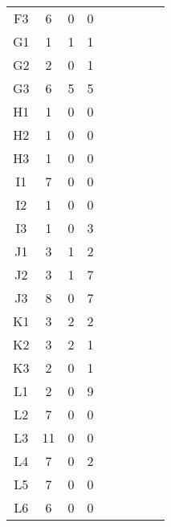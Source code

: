 \begin{center}
\begin{longtable}{ccccc|cccc}
    F3    & 6     & 0     & 0 \\
    G1    & 1     & 1     & 1 \\
    G2    & 2     & 0     & 1 \\
    G3    & 6     & 5     & 5 \\
    H1    & 1     & 0     & 0 \\
    H2    & 1     & 0     & 0 \\
    H3    & 1     & 0     & 0 \\
    I1    & 7     & 0     & 0 \\
    I2    & 1     & 0     & 0 \\
    I3    & 1     & 0     & 3 \\
    J1    & 3     & 1     & 2 \\
    J2    & 3     & 1     & 7 \\
    J3    & 8     & 0     & 7 \\
    K1    & 3     & 2     & 2 \\
    K2    & 3     & 2     & 1 \\
    K3    & 2     & 0     & 1 \\
    L1    & 2     & 0     & 9 \\
    L2    & 7     & 0     & 0 \\
    L3    & 11    & 0     & 0 \\
    L4    & 7     & 0     & 2 \\
    L5    & 7     & 0     & 0 \\
    L6    & 6     & 0     & 0 \\


\end{longtable}
\end{center}

